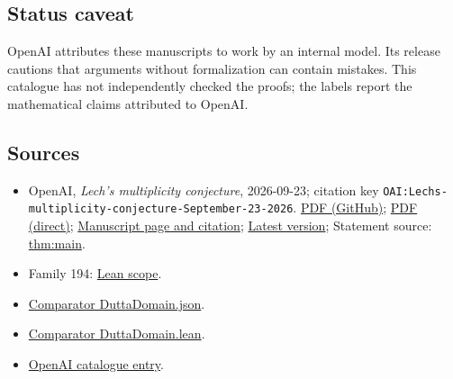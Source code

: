 \documentclass[11pt]{article}
\begin{document}
\subsection{Status caveat}
OpenAI attributes these manuscripts to work by an internal model. Its release cautions that arguments without formalization can contain mistakes. This catalogue has not independently checked the proofs; the labels report the mathematical claims attributed to OpenAI.

\subsection{Sources}
\begin{itemize}
\item OpenAI, \emph{Lech's multiplicity conjecture}, 2026-09-23; citation key \texttt{OAI:Lechs-multiplicity-conjecture-September-23-2026}. \href{https://github.com/openai/math/blob/adc7f1241b42e322a6451854ab7e4b4c146bf78a/preprints/Lechs-multiplicity-conjecture-September-23-2026/paper.pdf}{PDF (GitHub)}; \href{https://github.com/openai/math/raw/adc7f1241b42e322a6451854ab7e4b4c146bf78a/preprints/Lechs-multiplicity-conjecture-September-23-2026/paper.pdf}{PDF (direct)}; \href{https://github.com/openai/math/blob/adc7f1241b42e322a6451854ab7e4b4c146bf78a/preprints/Lechs-multiplicity-conjecture-September-23-2026/README.md}{Manuscript page and citation}; \href{https://github.com/openai/math/blob/main/preprints/Lechs-multiplicity-conjecture-September-23-2026/paper.pdf}{Latest version}; Statement source: \href{https://github.com/openai/math/blob/adc7f1241b42e322a6451854ab7e4b4c146bf78a/preprints/Lechs-multiplicity-conjecture-September-23-2026/build/main.tex\#L80}{thm:main}.
\item Family 194: \href{https://github.com/openai/math/blob/adc7f1241b42e322a6451854ab7e4b4c146bf78a/lean/docs/194.md}{Lean scope}.
\item \href{https://github.com/openai/math/blob/adc7f1241b42e322a6451854ab7e4b4c146bf78a/lean/ComparatorChallenges/DuttaDomain.json}{Comparator DuttaDomain.json}.
\item \href{https://github.com/openai/math/blob/adc7f1241b42e322a6451854ab7e4b4c146bf78a/lean/ComparatorChallenges/DuttaDomain.lean}{Comparator DuttaDomain.lean}.
\item \href{https://github.com/openai/math/blob/adc7f1241b42e322a6451854ab7e4b4c146bf78a/CONTENTS.md}{OpenAI catalogue entry}.
\end{itemize}
\end{document}
